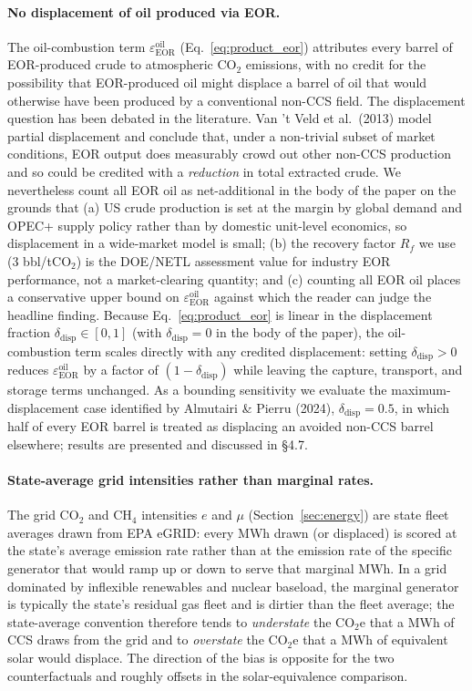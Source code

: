 \documentclass[11pt]{article}
\newcommand{\cotwo}{\ensuremath{\mathrm{CO_2}}}
\newcommand{\cotwoe}{\ensuremath{\mathrm{CO_{2}e}}}
\newcommand{\chfour}{\ensuremath{\mathrm{CH_4}}}
\begin{document}
\paragraph{No displacement of oil produced via EOR.} The oil-combustion term $\varepsilon_{\text{EOR}}^{\text{oil}}$ (Eq.~\ref{eq:product_eor}) attributes every barrel of EOR-produced crude to atmospheric \cotwo{} emissions, with no credit for the possibility that EOR-produced oil might displace a barrel of oil that would otherwise have been produced by a conventional non-CCS field. The displacement question has been debated in the literature. Van 't Veld et al.\ (2013) model partial displacement and conclude that, under a non-trivial subset of market conditions, EOR output does measurably crowd out other non-CCS production and so could be credited with a \emph{reduction} in total extracted crude. We nevertheless count all EOR oil as net-additional in the body of the paper on the grounds that (a) US crude production is set at the margin by global demand and OPEC+ supply policy rather than by domestic unit-level economics, so displacement in a wide-market model is small; (b) the recovery factor $R_f$ we use (3 bbl/t\cotwo{}) is the DOE/NETL assessment value for industry EOR performance, not a market-clearing quantity; and (c) counting all EOR oil places a conservative upper bound on $\varepsilon_{\text{EOR}}^{\text{oil}}$ against which the reader can judge the headline finding. Because Eq.~\eqref{eq:product_eor} is linear in the displacement fraction $\delta_{\text{disp}} \in [0,1]$ (with $\delta_{\text{disp}} = 0$ in the body of the paper), the oil-combustion term scales directly with any credited displacement: setting $\delta_{\text{disp}} > 0$ reduces $\varepsilon_{\text{EOR}}^{\text{oil}}$ by a factor of $(1-\delta_{\text{disp}})$ while leaving the capture, transport, and storage terms unchanged. As a bounding sensitivity we evaluate the maximum-displacement case identified by Almutairi \& Pierru (2024), $\delta_{\text{disp}} = 0.5$, in which half of every EOR barrel is treated as displacing an avoided non-CCS barrel elsewhere; results are presented and discussed in \S4.7.

\paragraph{State-average grid intensities rather than marginal rates.} The grid \cotwo{} and \chfour{} intensities $e$ and $\mu$ (Section~\ref{sec:energy}) are state fleet averages drawn from EPA eGRID: every MWh drawn (or displaced) is scored at the state's average emission rate rather than at the emission rate of the specific generator that would ramp up or down to serve that marginal MWh. In a grid dominated by inflexible renewables and nuclear baseload, the marginal generator is typically the state's residual gas fleet and is dirtier than the fleet average; the state-average convention therefore tends to \emph{understate} the \cotwoe{} that a MWh of CCS draws from the grid and to \emph{overstate} the \cotwoe{} that a MWh of equivalent solar would displace. The direction of the bias is opposite for the two counterfactuals and roughly offsets in the solar-equivalence comparison.
\end{document}
